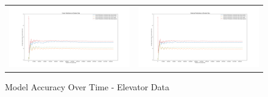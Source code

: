 \begin{figure}
  \begin{tabular}{cc}
    {\includegraphics[width = 3in]{images/results/Future_Predictions_on_Elevator_Data.png}} &
    {\includegraphics[width = 3in]{images/results/Historical_Predictions_on_Elevator_Data.png}} \\
  \end{tabular}
  \caption{Model Accuracy Over Time - Elevator Data}
  \label{figure:Model_Accuracy_Over_Time_-_Elevator_Data}
\end{figure}

